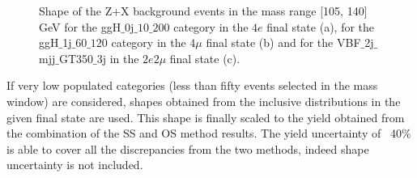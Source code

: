 \begin{figure}[h]
\begin{center}
\caption{Shape of the Z+X background events in the mass range [105, 140] GeV for the ggH$\_$0j$\_10\_200$ category in the $4e$ final state (a), 
for the ggH$\_$1j$\_60\_120$ category in the $4\mu$ final state (b) and for the VBF$\_$2j$\_$mjj$\_$GT350$\_$3j in the $2e2\mu$ final state (c).}
\label{fig:ZXshapesFinal}
\end{center}
\end{figure}

If very low populated categories (less than fifty events selected in the mass window) are considered,
shapes obtained from the inclusive distributions in the given final state are used.
This shape is finally scaled to the yield obtained from the combination of the SS and OS method results. 
The yield uncertainty of ~40$\%$ is able to cover all the discrepancies from the two methods, indeed shape uncertainty is not included. 

